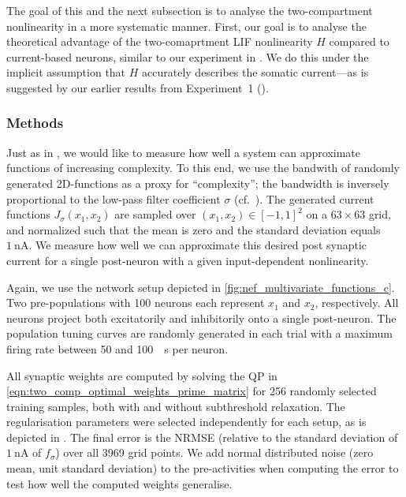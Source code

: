 The goal of this and the next subsection is to analyse the two-compartment nonlinearity in a more systematic manner.
First, our goal is to analyse the theoretical advantage of the two-comaprtment LIF nonlinearity $H$ compared to current-based neurons, similar to our experiment in .
We do this under the implicit assumption that $H$ accurately describes the somatic current---as is suggested by our earlier results from Experiment~1 ().

\subsubsection{Methods}
Just as in , we would like to measure how well a system can approximate functions of increasing complexity.
To this end, we use the bandwith of randomly generated 2D-functions as a proxy for \enquote{complexity}; the bandwidth is inversely proportional to the low-pass filter coefficient $\sigma$ (cf.~).
The generated current functions $J_\sigma(x_1, x_2)$ are sampled over $(x_1, x_2) \in [-1, 1]^2$ on a $63 \times 63$ grid, and normalized such that the mean is zero and the standard deviation equals $\SI{1}{\nano\ampere}$.
We measure how well we can approximate this desired post synaptic current for a single post-neuron with a given input-dependent nonlinearity.

Again, we use the network setup depicted in \cref{fig:nef_multivariate_functions_c}.
Two pre-populations with \num{100} neurons each represent $x_1$ and $x_2$, respectively.
All neurons project both excitatorily and inhibitorily onto a single post-neuron.
The population tuning curves are randomly generated in each trial with a maximum firing rate between \num{50} and \SI{100}{\per\second} per neuron.

All synaptic weights are computed by solving the QP in \cref{eqn:two_comp_optimal_weights_prime_matrix} for 256 randomly selected training samples, both with and without subthreshold relaxation.
The regularisation parameters were selected independently for each setup, as is depicted in .
The final error is the NRMSE (relative to the standard deviation of $\SI{1}{\nano\ampere}$ of $f_\sigma$) over all \num{3969} grid points.
We add normal distributed noise (zero mean, unit standard deviation) to the pre-activities when computing the error to test how well the computed weights generalise.

